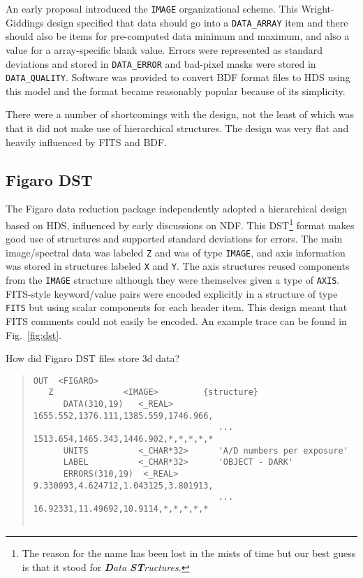 \documentclass[final,authoryear,5p,times,twocolumn]{elsarticle}
\begin{document}
{An early proposal \citep[][but see also \citet{SGP38}]{WrightGiddings1983} introduced the
\texttt{IMAGE} organizational scheme. This Wright-Giddings design specified that
data should go into a \texttt{DATA\_ARRAY} item and there should also be
items for pre-computed data minimum and maximum, and also a value for
a array-specific blank value. Errors were represented as standard
deviations and stored in \texttt{DATA\_ERROR} and bad-pixel masks were
stored in \texttt{DATA\_QUALITY}. Software was provided to convert BDF
format files to HDS using this model \citep{SUN96} and the format became
reasonably popular because of its simplicity.

There were a number of shortcomings with the design, not the least of
which was that it did not make use of hierarchical structures. The
design was very flat and heavily influenced by FITS and BDF.

\subsection{Figaro DST}

The Figaro data reduction package
\citep[][ascl:1203.013]{1988igbo.conf..448C,1993ASPC...52..219S} independently adopted
a hierarchical design based on HDS, influenced by early discussions on
NDF. This DST\footnote{The reason for the name has been lost in the
  mists of time but our best guess is that it stood for \emph{\textbf{D}ata
  \textbf{ST}ructures}.} format makes good use of structures and supported
standard deviations for errors. The main image/spectral data was
labeled \texttt{Z} and was of type \texttt{IMAGE}, and axis
information was stored in structures labeled \texttt{X} and
\texttt{Y}. The axis structures reused components from the
\texttt{IMAGE} structure although they were themselves given a type of
\texttt{AXIS}. FITS-style keyword/value pairs were encoded explicitly
in a structure of type \texttt{FITS} but using scalar components for
each header item. This design meant that FITS comments could not
easily be encoded. An example trace can be found in Fig.\ \ref{fig:dst}.

{\color{red} How did Figaro DST files store 3d data?}

\begin{figure*}
\begin{minipage}{\textwidth}
\begin{quote}
\small
\begin{verbatim}
OUT  <FIGARO>
   Z              <IMAGE>         {structure}
      DATA(310,19)   <_REAL>         1655.552,1376.111,1385.559,1746.966,
                                     ... 1513.654,1465.343,1446.902,*,*,*,*,*
      UNITS          <_CHAR*32>      'A/D numbers per exposure'
      LABEL          <_CHAR*32>      'OBJECT - DARK'
      ERRORS(310,19)  <_REAL>        9.330093,4.624712,1.043125,3.801913,
                                     ... 16.92331,11.49692,10.9114,*,*,*,*,*


\end{verbatim}
\end{quote}
\end{minipage}
\end{figure*}}
\end{document}
